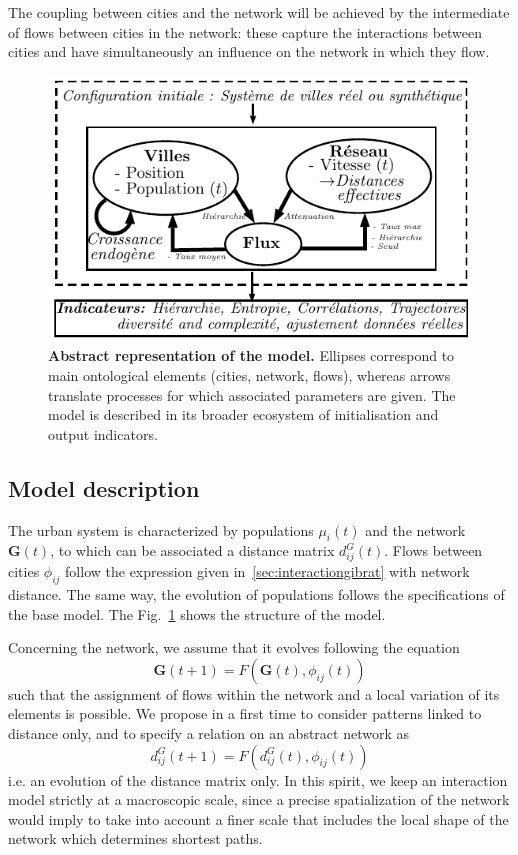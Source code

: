 The coupling between cities and the network will be achieved by the intermediate of flows between cities in the network: these capture the interactions between cities and have simultaneously an influence on the network in which they flow.


\begin{figure}
\includegraphics[width=\linewidth]{figures/model}
\caption[Schematic model representation]{\textbf{Abstract representation of the model.} Ellipses correspond to main ontological elements (cities, network, flows), whereas arrows translate processes for which associated parameters are given. The model is described in its broader ecosystem of initialisation and output indicators.\label{fig:macrocoevol:model}}
\end{figure}


\subsection{Model description}

The urban system is characterized by populations $\mu_i(t)$ and the network $\mathbf{G}(t)$, to which can be associated a distance matrix $d^G_{ij}(t)$. Flows between cities $\phi_{ij}$ follow the expression given in~\ref{sec:interactiongibrat} with network distance. The same way, the evolution of populations follows the specifications of the base model. The Fig.~\ref{fig:macrocoevol:model} shows the structure of the model.


Concerning the network, we assume that it evolves following the equation
\begin{equation}
\mathbf{G}(t + 1) = F(\mathbf{G}(t),\phi_{ij}(t))
\end{equation}
such that the assignment of flows within the network and a local variation of its elements is possible. We propose in a first time to consider patterns linked to distance only, and to specify a relation on an abstract network as
\begin{equation}
d^G_{ij}(t+1) = F(d^G_{ij}(t),\phi_{ij}(t))
\end{equation}
i.e. an evolution of the distance matrix only. In this spirit, we keep an interaction model strictly at a macroscopic scale, since a precise spatialization of the network would imply to take into account a finer scale that includes the local shape of the network which determines shortest paths.



